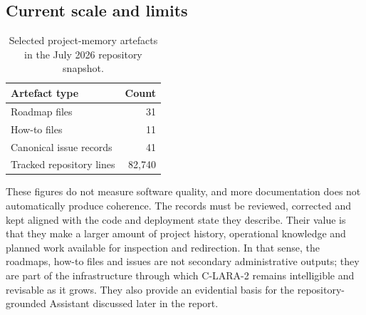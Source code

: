 \subsection{Current scale and limits}

\begin{table}[htbp]
\centering
\caption{Selected project-memory artefacts in the July 2026 repository snapshot.}
\begin{tabular}{lr}
\toprule
Artefact type & Count \\
\midrule
Roadmap files & 31 \\
How-to files & 11 \\
Canonical issue records & 41 \\
Tracked repository lines & 82,740 \\
\bottomrule
\end{tabular}
\end{table}

These figures do not measure software quality, and more documentation does not
automatically produce coherence. The records must be reviewed, corrected and
kept aligned with the code and deployment state they describe. Their value is
that they make a larger amount of project history, operational knowledge and
planned work available for inspection and redirection. In that sense, the
roadmaps, how-to files and issues are not secondary administrative outputs;
they are part of the infrastructure through which C-LARA-2 remains intelligible
and revisable as it grows. They also provide an evidential basis for the
repository-grounded Assistant discussed later in the report.
